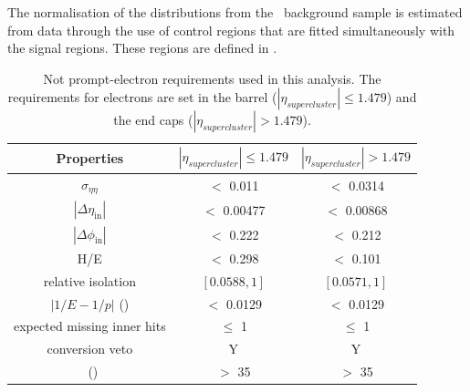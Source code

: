 The normalisation of the distributions from the \NPL\ background sample is estimated from data through the use of control regions that are fitted simultaneously with the signal regions. These regions are defined in .
\begin{table}[htbp]
	\centering
	
	\caption{Not prompt-electron requirements used in this analysis. The requirements for electrons are set in the barrel ($|\eta_{supercluster}| \leq 1.479$)
		and the end caps ($|\eta_{supercluster}| > 1.479$). }
	\begin{tabular}{ccc}
		\toprule
	 Properties	& \multicolumn{1}{c}{$|\eta_{supercluster}| \leq 1.479$ } & \multicolumn{1}{c}{$|\eta_{supercluster}| > 1.479$ } \\
		\midrule
		$\sigma_{\eta \eta}$ & $<$ 0.011 & $<$ 0.0314 \\ 
		
		$|\Delta\eta_{\mathrm{in}}|$ & $<$ 0.00477& $<$ 0.00868\\ 
		
		$|\Delta\phi_{\mathrm{in}}|$ & $<$ 0.222 &  $<$ 0.212 \\ 
		 
		H/E & $<$ 0.298& $<$ 0.101 \\ 
		
		relative isolation & $\left[ 0.0588  , 1\right]$ &  $\left[ 0.0571, 1\right]$\\ 
	
		$|1/E-1/p|$ (\GeVinv) & $<$ 0.0129  & $<$ 0.0129  \\ 
		
		expected missing inner hits & $\leq $ 1 &  $\leq $ 1\\ 
	
		 conversion veto & Y & Y \\ 
	
		\pt\ (\GeV) &$>$ 35 & $>$ 35  \\
		\bottomrule
	\end{tabular} 
	\label{tab:nonpromptel}
\end{table}

